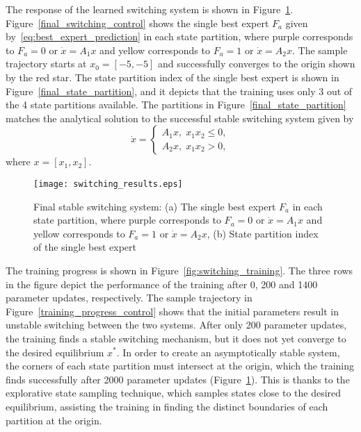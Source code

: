 The response of the learned switching system is shown in
Figure~\ref{fig:final_switching}.
%
Figure~\ref{final_switching_control} shows the single best expert $F_a$
given by~\eqref{eq:best_expert_prediction} in each state partition, where purple
corresponds to $F_a=0$ or $\dot{x} = A_1x$ and yellow corresponds to $F_a=1$ or
$\dot{x} = A_2x$. The sample trajectory starts at $x_0=[-5, -5]$ and
successfully converges to the origin shown by the red star.
%
The state partition index of the single best expert is shown in
Figure~\ref{final_state_partition}, and it depicts that the training uses only 3
out of the 4 state partitions available.
%
The partitions in Figure~\ref{final_state_partition} matches the analytical
solution to the successful stable switching system given
by\cite{liberzon2003switching}
\begin{equation*}
    \dot{x} = \begin{cases}
        A_1x, \; x_1x_2 \leq 0, \\
        A_2x, \; x_1x_2 > 0,
    \end{cases}
\end{equation*}
\noindent where $x=[x_1, x_2]$.
%
\begin{figure}[tb]
    \centering
    \texttt{[image: switching\_results.eps]}
    \subfloat[\label{final_switching_control}]{\hspace{0.49\linewidth}} \subfloat[\label{final_state_partition}]{\hspace{0.35\linewidth}}
    \caption{Final stable switching system: (a) The single best expert $F_a$ in
    each state partition, where purple corresponds to $F_a=0$ or $\dot{x} =
    A_1x$ and yellow corresponds to $F_a=1$ or $\dot{x} = A_2x$, (b) State
    partition index of the single best expert}
    \label{fig:final_switching}
\end{figure}

%
The training progress is shown in Figure~\ref{fig:switching_training}.
%
The three rows in the figure depict the performance of the training after 0, 200
and 1400 parameter updates, respectively.
%
The sample trajectory in Figure~\ref{training_progress_control} shows that the
initial parameters result in unstable switching between the two systems.
%
After only 200 parameter updates, the training finds a stable switching
mechanism, but it does not yet converge to the desired equilibrium $x^*$.
%
In order to create an asymptotically stable system, the corners of each state
partition must intersect at the origin, which the training finds successfully
after 2000 parameter updates (Figure~\ref{fig:final_switching}).
%
This is thanks to the explorative state sampling technique, which samples states
close to the desired equilibrium, assisting the training in finding the distinct
boundaries of each partition at the origin. 



